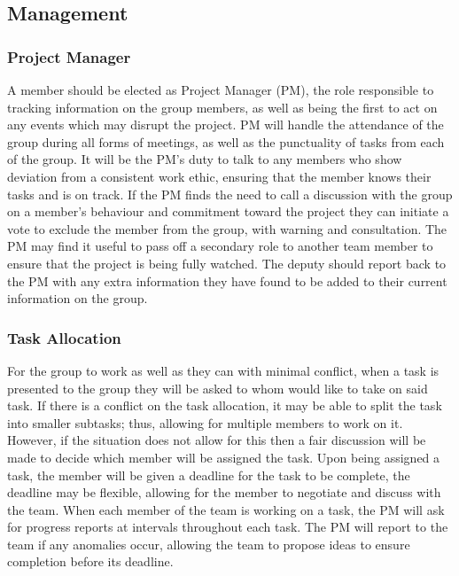 \documentclass[
  english,
  a4paper,
,tablecaptionabove
]{scrartcl}
\begin{document}
\hypertarget{management}{%
\subsection{Management}\label{management}}

\hypertarget{project-manager}{%
\subsubsection{Project Manager}\label{project-manager}}

A member should be elected as Project Manager (PM), the role responsible
to tracking information on the group members, as well as being the first
to act on any events which may disrupt the project. PM will handle the
attendance of the group during all forms of meetings, as well as the
punctuality of tasks from each of the group. It will be the PM's duty to
talk to any members who show deviation from a consistent work ethic,
ensuring that the member knows their tasks and is on track. If the PM
finds the need to call a discussion with the group on a member's
behaviour and commitment toward the project they can initiate a vote to
exclude the member from the group, with warning and consultation. The PM
may find it useful to pass off a secondary role to another team member
to ensure that the project is being fully watched. The deputy should
report back to the PM with any extra information they have found to be
added to their current information on the group.

\hypertarget{task-allocation}{%
\subsubsection{Task Allocation}\label{task-allocation}}

For the group to work as well as they can with minimal conflict, when a
task is presented to the group they will be asked to whom would like to
take on said task. If there is a conflict on the task allocation, it may
be able to split the task into smaller subtasks; thus, allowing for
multiple members to work on it. However, if the situation does not allow
for this then a fair discussion will be made to decide which member will
be assigned the task. Upon being assigned a task, the member will be
given a deadline for the task to be complete, the deadline may be
flexible, allowing for the member to negotiate and discuss with the
team. When each member of the team is working on a task, the PM will ask
for progress reports at intervals throughout each task. The PM will
report to the team if any anomalies occur, allowing the team to propose
ideas to ensure completion before its deadline.
\end{document}
